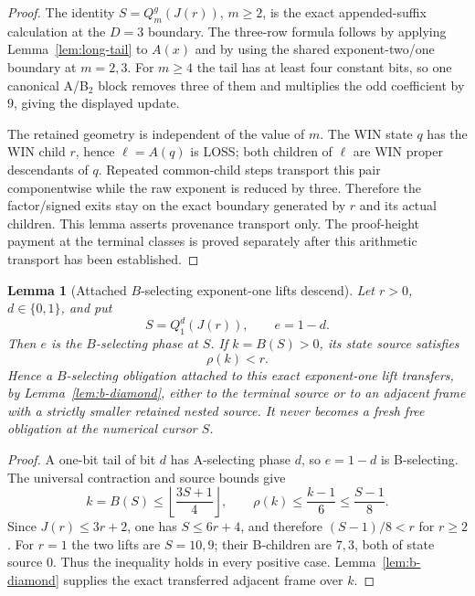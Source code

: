 \documentclass[11pt]{article}
\newtheorem{lemma}[theorem]{Lemma}
\begin{document}
\begin{proof}
The identity $S=Q_m^g(J(r))$, $m\ge2$, is the exact appended-suffix
calculation at the $D=3$ boundary. The three-row formula follows by applying
Lemma~\ref{lem:long-tail} to $A(x)$ and by using the shared exponent-two/one
boundary at $m=2,3$. For $m\ge4$ the tail has at least four constant bits,
so one canonical A/B$_2$ block removes three of them and multiplies the odd
coefficient by $9$, giving the displayed update.

The retained geometry is independent of the value of $m$. The WIN state $q$
has the WIN child $r$, hence $\ell=A(q)$ is LOSS; both children of $\ell$
are WIN proper descendants of $q$. Repeated common-child steps transport this
pair componentwise while the raw exponent is reduced by three. Therefore the
factor/signed exits stay on the exact boundary generated by $r$ and its actual
children. This lemma asserts provenance transport only.  The proof-height
payment at the terminal classes is proved separately after this arithmetic
transport has been established.
\end{proof}

\begin{lemma}[Attached $B$-selecting exponent-one lifts descend]
\label{lem:attached-b}
Let $r>0$, $d\in\{0,1\}$, and put
\[
 S=Q_1^d(J(r)),\qquad e=1-d.
\]
Then $e$ is the $B$-selecting phase at $S$.  If $k=B(S)>0$, its state source
satisfies
\[
 \boxed{\rho(k)<r}.
\]
Hence a $B$-selecting obligation attached to this exact exponent-one lift
transfers, by Lemma~\ref{lem:b-diamond}, either to the terminal source or to
an adjacent frame with a strictly smaller retained nested source.  It never
becomes a fresh free obligation at the numerical cursor $S$.
\end{lemma}

\begin{proof}
A one-bit tail of bit $d$ has A-selecting phase $d$, so $e=1-d$ is
B-selecting.  The universal contraction and source bounds give
\[
 k=B(S)\le\left\lfloor\frac{3S+1}{4}\right\rfloor,
 \qquad
 \rho(k)\le\frac{k-1}{6}\le\frac{S-1}{8}.
\]
Since $J(r)\le3r+2$, one has $S\le6r+4$, and therefore
$(S-1)/8<r$ for $r\ge2$.  For $r=1$ the two lifts are $S=10,9$;
their B-children are $7,3$, both of state source $0$.  Thus the inequality
holds in every positive case.  Lemma~\ref{lem:b-diamond} supplies the exact
transferred adjacent frame over $k$.
\end{proof}
\end{document}
